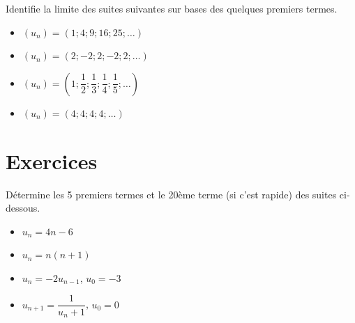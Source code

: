 \documentclass[a4paper,12pt]{report}
\begin{document}
Identifie la limite des suites suivantes sur bases des quelques premiers
termes.

\par \setlength{\columnseprule}{0 pt}
          \begin{minipage}[t]{\linewidth}
          \begin{multicols}{2}
\begin{itemize}
\item \((u_n)=(1;4;9;16;25;\ldots)\)
\item \((u_n)=(2;-2;2;-2;2;\ldots)\)
\end{itemize}
\begin{itemize}
\item \((u_n)=\left(1;\dfrac{1}{2};\dfrac{1}{3};\dfrac{1}{4};\dfrac{1}{5};\ldots\right)\)
\item \((u_n)=(4;4;4;4;\ldots)\)
\end{itemize}


\end{multicols}\end{minipage}

\section{Exercices}
\label{sec:orgb8fa326}
\begin{exercice}
Détermine les 5 premiers termes et le 20ème terme (si c'est rapide) des suites
ci-dessous.
\par \setlength{\columnseprule}{0 pt}
          \begin{minipage}[t]{\linewidth}
          \begin{multicols}{2}
\begin{itemize}
\item \(u_n=4n-6\)
\item \(u_n=n(n+1)\)
\item \(u_n=-2u_{n-1}\), \(u_0=-3\)
\item \(u_{n+1}=\dfrac{1}{u_n+1}\), \(u_0=0\)
\end{itemize}


\end{multicols}\end{minipage}
\end{exercice}
\end{document}
